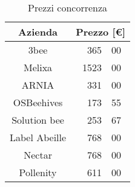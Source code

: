 \begin{table}[!h]
\centering
\begin{tabular}{c|r@{.}l}
Azienda
& \multicolumn{2}{|c}{Prezzo [\euro]}
\\          
\hline
3bee          & 365    & 00  \\
Melixa        & 1523   & 00  \\
ARNIA         & 331    & 00  \\
OSBeehives    & 173    & 55  \\
Solution bee  & 253    & 67  \\
Label Abeille & 768    & 00  \\
Nectar        & 768    & 00  \\
Pollenity     & 611    & 00 
\end{tabular}
\caption{Prezzi concorrenza}
\label{tab:concorrenza}
\end{table}
